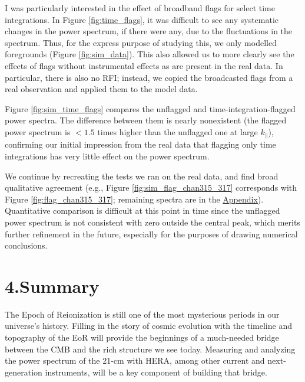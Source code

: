 \documentclass[12pt]{article}
\begin{document}
I was particularly interested in the effect of broadband flags for select time integrations. In Figure \ref{fig:time_flags}, it was difficult to see any systematic changes in the power spectrum, if there were any, due to the fluctuations in the spectrum. Thus, for the express purpose of studying this, we only modelled foregrounds (Figure \ref{fig:sim_data}). This also allowed us to more clearly see the effects of flags without instrumental effects as are present in the real data. In particular, there is also no RFI; instead, we copied the broadcasted flags from a real observation and applied them to the model data.

Figure \ref{fig:sim_time_flags} compares the unflagged and time-integration-flagged power spectra. The difference between them is nearly nonexistent (the flagged power spectrum is $< 1.5$ times higher than the unflagged one at large $k_\parallel$), confirming our initial impression from the real data that flagging only time integrations has very little effect on the power spectrum.

We continue by recreating the tests we ran on the real data, and find broad qualitative agreement (e.g., Figure \ref{fig:sim_flag_chan315_317} corresponds with Figure \ref{fig:flag_chan315_317}; remaining spectra are in the \hyperlink{appendix}{Appendix}). Quantitative comparison is difficult at this point in time since the unflagged power spectrum is not consistent with zero outside the central peak, which merits further refinement in the future, especially for the purposes of drawing numerical conclusions. \vspace{3mm}

\tocless\section{\hypertarget{sec:summary}{4.\hspace{0.75em}Summary}}

The Epoch of Reionization is still one of the most mysterious periods in our universe's history. Filling in the story of cosmic evolution with the timeline and topography of the EoR will provide the beginnings of a much-needed bridge between the CMB and the rich structure we see today. Measuring and analyzing the power spectrum of the 21-cm with HERA, among other current and next-generation instruments, will be a key component of building that bridge.
\end{document}
